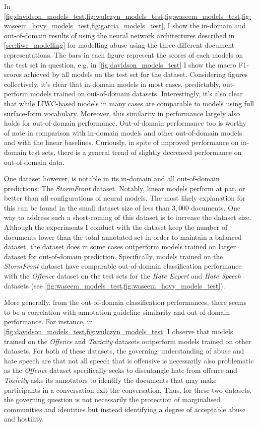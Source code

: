 In \cref{fig:davidson_models_test,fig:wulczyn_models_test,fig:waseem_models_test,fig:waseem_hovy_models_test,fig:garcia_models_test}, I show the in-domain and out-of-domain results of using the neural network architectures described in \cref{sec:liwc_modelling} for modelling abuse using the three different document representations. The bars in each figure represent the scores of each models on the test set in question, e.g. in \cref{fig:davidson_models_test} I show the macro F1-scores achieved by all models on the test set for the \citet{Offence} dataset.
Considering figures collectively, it's clear that in-domain models in most cases, predictably, out-perform models trained on out-of-domain datasets. Interestingly, it's also clear that while LIWC-based models in many cases are comparable to models using full surface-form vocabulary. Moreover, this similarity in performance largely also holds for out-of-domain performance.
Out-of-domain performance too is worthy of note in comparison with in-domain models and other out-of-domain models and with the linear baselines. Curiously, in spite of improved performance on in-domain test sets, there is a general trend of slightly decreased performance on out-of-domain data.

One dataset however, is notable in its in-domain and all out-of-domain predictions: The \textit{StormFront} dataset. Notably, linear models perform at par, or better than all configurations of neural models. The most likely explanation for this can be found in the small dataset size of less than $3,000$ documents. One way to address such a short-coming of this dataset is to increase the dataset size. Although the experiments I conduct with the dataset keep the number of documents lower than the total annotated set in order to maintain a balanced dataset, the dataset does in some cases outperform models trained on larger dataset for out-of-domain prediction. Specifically, models trained on the \textit{StormFront} dataset have comparable out-of-domain classification performance with the \textit{Offence} dataset on the test sets for the \textit{Hate Expert} and \textit{Hate Speech} datasets (see \cref{fig:waseem_models_test,fig:waseem_hovy_models_test}).

More generally, from the out-of-domain classification performances, there seems to be a correlation with annotation guideline similarity and out-of-domain performance. For instance, in \cref{fig:davidson_models_test,fig:wulczyn_models_test} I observe that models trained on the \textit{Offence} and \textit{Toxicity} datasets outperform models trained on other datasets. For both of these datasets, the governing understanding of abuse and hate speech are that not all speech that is offensive is necessarily also problematic as the \textit{Offence} dataset specifically seeks to disentangle hate from offence and \textit{Toxicity} asks its annotators to identify the documents that may make participants in a conversation exit the conversation. Thus, for these two datasets, the governing question is not necessarily the protection of marginalised communities and identities but instead identifying a degree of acceptable abuse and hostility.

